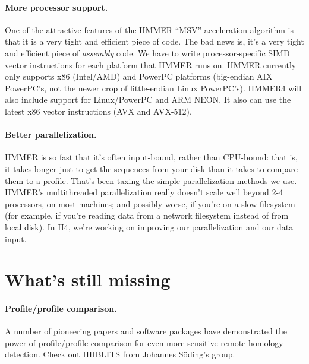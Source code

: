 \paragraph{More processor support.} One of the attractive features of the
HMMER ``MSV'' acceleration algorithm is that it is a very tight and
efficient piece of code. The bad news is, it's a very tight and
efficient piece of \emph{assembly} code. We have to write
processor-specific SIMD vector instructions for each platform that
HMMER runs on. HMMER currently only supports x86 (Intel/AMD) and
PowerPC platforms (big-endian AIX PowerPC's, not the newer crop of
little-endian Linux PowerPC's). HMMER4 will also include support for
Linux/PowerPC and ARM NEON. It also can use the latest x86 vector
instructions (AVX and AVX-512).

\paragraph{Better parallelization.} HMMER is so fast that it's often
input-bound, rather than CPU-bound: that is, it takes longer just to
get the sequences from your disk than it takes to compare them to a
profile. That's been taxing the simple parallelization methods we
use. HMMER's multithreaded parallelization really doesn't scale well
beyond 2-4 processors, on most machines; and possibly worse, if you're
on a slow filesystem (for example, if you're reading data from a
network filesystem instead of from local disk). In H4, we're working
on improving our parallelization and our data input.





\section{What's still missing}

\paragraph{Profile/profile comparison.} A number of pioneering papers and
software packages have demonstrated the power of profile/profile
comparison for even more sensitive remote homology detection.  Check
out HHBLITS from Johannes S\"oding's
group.



